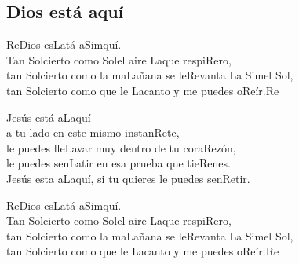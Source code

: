 \subsection{Dios está aquí}
\begin{center}

{\Large
\ac{Re}Dios es\ac{La}tá a\ac{Sim}quí.\\
Tan \ac{Sol}cierto como \ac{Sol}el aire \ac{La}que respi\ac{Re}ro,\\
tan \ac{Sol}cierto como la ma\ac{La}ñana se le\ac{Re}vanta \ac{La Sim}el Sol,\\
tan \ac{Sol}cierto como que le \ac{La}canto y me puedes o\ac{Re}ír.\hspace{2ex}\ac{Re}\\
\vspace{2em}

Jesús está a\ac{La}quí\\
a tu lado en este mismo instan\ac{Re}te,\\
le puedes lle\ac{La}var muy dentro de tu cora\ac{Re}zón,\\
le puedes sen\ac{La}tir en esa prueba que tie\ac{Re}nes.\\
Jesús esta a\ac{La}quí, si tu quieres le puedes sen\ac{Re}tir.\\
\vspace{2em}

\ac{Re}Dios es\ac{La}tá a\ac{Sim}quí.\\
Tan \ac{Sol}cierto como \ac{Sol}el aire \ac{La}que respi\ac{Re}ro,\\
tan \ac{Sol}cierto como la ma\ac{La}ñana se le\ac{Re}vanta \ac{La Sim}el Sol,\\
tan \ac{Sol}cierto como que le \ac{La}canto y me puedes o\ac{Re}ír.\hspace{2ex}\ac{Re}\\
}
\end{center}
\pagebreak
